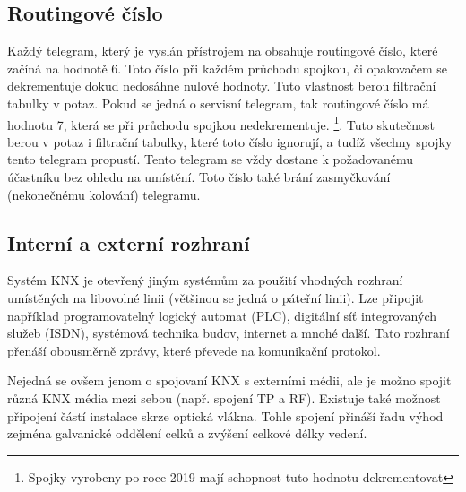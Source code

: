 \subsection{Routingové číslo}
Každý telegram, který je vyslán přístrojem na obsahuje routingové číslo, které začíná na hodnotě 6. Toto číslo při každém průchodu spojkou, či opakovačem se dekrementuje dokud nedosáhne nulové hodnoty. Tuto vlastnost berou filtrační tabulky v potaz.
Pokud se jedná o servisní telegram, tak routingové číslo má hodnotu 7, která se při průchodu spojkou nedekrementuje. \footnote{Spojky vyrobeny po roce 2019 mají schopnost tuto hodnotu dekrementovat}. Tuto skutečnost berou v potaz i filtrační tabulky, které toto číslo ignorují, a tudíž všechny spojky tento telegram propustí. Tento telegram se vždy dostane k požadovanému účastníku bez ohledu na umístění.
Toto číslo také brání zasmyčkování (nekonečnému kolování) telegramu. \cite{Topologie}
\subsection{Interní a externí rozhraní}
Systém KNX je otevřený jiným systémům za použití vhodných rozhraní umístěných na libovolné linii (většinou se jedná o páteřní linii). Lze připojit například programovatelný logický automat (PLC), digitální síť integrovaných služeb (ISDN), systémová technika budov, internet a mnohé další.
Tato rozhraní přenáší obousměrně zprávy, které převede na komunikační protokol.

Nejedná se ovšem jenom o spojovaní KNX s externími médii, ale je možno spojit různá KNX média mezi sebou (např. spojení TP a RF). Existuje také možnost připojení částí instalace skrze optická vlákna. Tohle spojení přináší řadu výhod zejména galvanické oddělení celků a zvýšení celkové délky vedení. \cite{Topologie}
